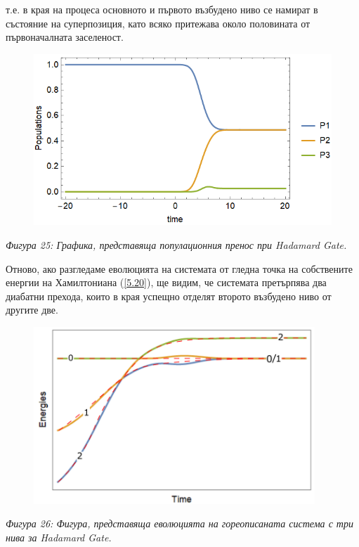     т.е. в края на процеса основното и първото възбудено ниво се намират в състояние на суперпозиция, като всяко притежава
    около половината от първоначалната заселеност.

    \begin{figure}[H]
        \centering
        \includegraphics[width=370pt]{24.png}
    \end{figure}
    \begin{center}
        \small \textit{Фигура 25: Графика, представяща популационния пренос при Hadamard Gate.}\\
    \end{center}

    Отново, ако разгледаме еволюцията на системата от гледна точка на собствените енергии на Хамилтониана (\ref{5.20}), ще
    видим, че системата претърпява два диабатни прехода, които в края успещно отделят второто възбудено ниво от другите две.

    \begin{figure}[H]
        \centering
        \includegraphics[width=300pt]{27.png}
    \end{figure}
    \begin{center}
        \small \textit{Фигура 26: Фигура, представяща еволюцията на гореописаната система с три нива за Hadamard Gate.}\\
    \end{center}

